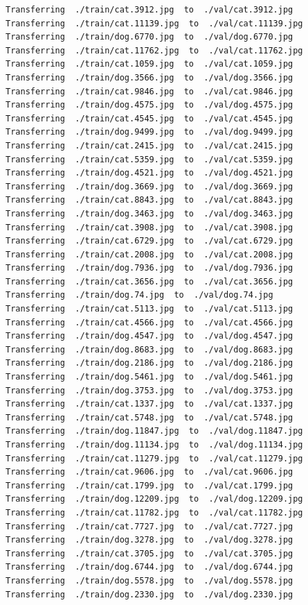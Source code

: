 \documentclass[]{book}
\theoremstyle{definition}
\theoremstyle{definition}
\theoremstyle{definition}
\theoremstyle{remark}
\begin{document}
\begin{verbatim}
Transferring  ./train/cat.3912.jpg  to  ./val/cat.3912.jpg
Transferring  ./train/cat.11139.jpg  to  ./val/cat.11139.jpg
Transferring  ./train/dog.6770.jpg  to  ./val/dog.6770.jpg
Transferring  ./train/cat.11762.jpg  to  ./val/cat.11762.jpg
Transferring  ./train/cat.1059.jpg  to  ./val/cat.1059.jpg
Transferring  ./train/dog.3566.jpg  to  ./val/dog.3566.jpg
Transferring  ./train/cat.9846.jpg  to  ./val/cat.9846.jpg
Transferring  ./train/dog.4575.jpg  to  ./val/dog.4575.jpg
Transferring  ./train/cat.4545.jpg  to  ./val/cat.4545.jpg
Transferring  ./train/dog.9499.jpg  to  ./val/dog.9499.jpg
Transferring  ./train/cat.2415.jpg  to  ./val/cat.2415.jpg
Transferring  ./train/cat.5359.jpg  to  ./val/cat.5359.jpg
Transferring  ./train/dog.4521.jpg  to  ./val/dog.4521.jpg
Transferring  ./train/dog.3669.jpg  to  ./val/dog.3669.jpg
Transferring  ./train/cat.8843.jpg  to  ./val/cat.8843.jpg
Transferring  ./train/dog.3463.jpg  to  ./val/dog.3463.jpg
Transferring  ./train/cat.3908.jpg  to  ./val/cat.3908.jpg
Transferring  ./train/cat.6729.jpg  to  ./val/cat.6729.jpg
Transferring  ./train/cat.2008.jpg  to  ./val/cat.2008.jpg
Transferring  ./train/dog.7936.jpg  to  ./val/dog.7936.jpg
Transferring  ./train/cat.3656.jpg  to  ./val/cat.3656.jpg
Transferring  ./train/dog.74.jpg  to  ./val/dog.74.jpg
Transferring  ./train/cat.5113.jpg  to  ./val/cat.5113.jpg
Transferring  ./train/cat.4566.jpg  to  ./val/cat.4566.jpg
Transferring  ./train/dog.4547.jpg  to  ./val/dog.4547.jpg
Transferring  ./train/dog.8683.jpg  to  ./val/dog.8683.jpg
Transferring  ./train/dog.2186.jpg  to  ./val/dog.2186.jpg
Transferring  ./train/dog.5461.jpg  to  ./val/dog.5461.jpg
Transferring  ./train/dog.3753.jpg  to  ./val/dog.3753.jpg
Transferring  ./train/cat.1337.jpg  to  ./val/cat.1337.jpg
Transferring  ./train/cat.5748.jpg  to  ./val/cat.5748.jpg
Transferring  ./train/dog.11847.jpg  to  ./val/dog.11847.jpg
Transferring  ./train/dog.11134.jpg  to  ./val/dog.11134.jpg
Transferring  ./train/cat.11279.jpg  to  ./val/cat.11279.jpg
Transferring  ./train/cat.9606.jpg  to  ./val/cat.9606.jpg
Transferring  ./train/cat.1799.jpg  to  ./val/cat.1799.jpg
Transferring  ./train/dog.12209.jpg  to  ./val/dog.12209.jpg
Transferring  ./train/cat.11782.jpg  to  ./val/cat.11782.jpg
Transferring  ./train/cat.7727.jpg  to  ./val/cat.7727.jpg
Transferring  ./train/dog.3278.jpg  to  ./val/dog.3278.jpg
Transferring  ./train/cat.3705.jpg  to  ./val/cat.3705.jpg
Transferring  ./train/dog.6744.jpg  to  ./val/dog.6744.jpg
Transferring  ./train/dog.5578.jpg  to  ./val/dog.5578.jpg
Transferring  ./train/dog.2330.jpg  to  ./val/dog.2330.jpg

\end{verbatim}
\end{document}
